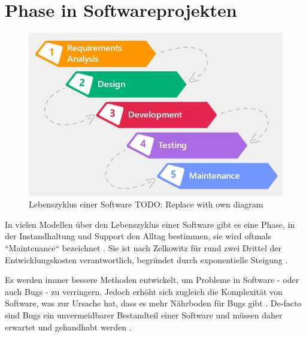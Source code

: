 
\section{Phase in Softwareprojekten}

	\begin{figure}
		\centering
		\vspace{-\baselineskip}
		\includegraphics[width=\linewidth]{img/software-development-life-cycle.jpg}
		\caption{Lebenszyklus einer Software {\color{red}TODO: Replace with own diagram}}
		\label{fig:software-development-life-cycle}
	\end{figure}
	
	In vielen Modellen über den Lebenszyklus einer Software gibt es eine Phase, in der Instandhaltung und Support den Alltag bestimmen, sie wird oftmals ``Maintenance`` bezeichnet \cite{ManagingTheComplexityOfWebSystemsDevelopment} \cite{CostBenefitAnalaysisHumanFactorsSoftwareLifecycle}. Sie ist nach Zelkowitz \etal \cite{PrinciplesOfSoftwareEngineeringAndDesign} für rund zwei Drittel der Entwicklungskosten verantwortlich, begründet durch exponentielle Steigung \cite{ExtremeProgrammingExplained}.
	
	Es werden immer bessere Methoden entwickelt, um Probleme in Software - oder auch Bugs - zu verringern. Jedoch erhöht sich zugleich die Komplexität von Software, was zur Ursache hat, dass es mehr Nährboden für Bugs gibt \cite{TrackingDownSoftwareBugsAnomalyDetection}. De-facto sind Bugs ein unvermeidbarer Bestandteil einer Software und müssen daher erwartet und gehandhabt werden \cite{TheMythicalManMonth}.
	

